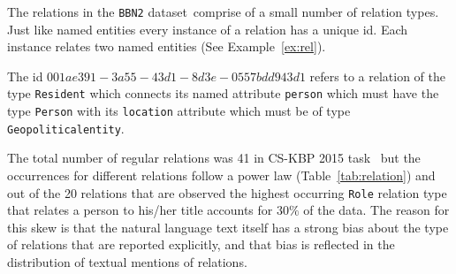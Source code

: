 \documentclass[paper=a4,fontsize=11pt]{scrartcl}
\newcommand{\Tabref}[1]{Table~\ref{#1}}
\newcommand{\Exref}[1]{Example~\ref{#1}}
\numberwithin{equation}{section}    %
\numberwithin{figure}{section}      %
\numberwithin{table}{section}       %
\newcommand{\dataset}[0]{\texttt{BBN2} dataset\ }
\newcommand{\task}{CS-KBP 2015 task\ }
\begin{document}
The relations in the \dataset comprise of a small number of relation types.
Just like named entities every instance of a relation has a unique id.
Each instance relates two named entities (See \Exref{ex:rel}).
\begin{example}\label{ex:rel}
  The id $001ae391-3a55-43d1-8d3e-0557bdd943d1$ refers to a relation of the
type \texttt{Resident} which connects its named attribute \texttt{person}
which must have the type \texttt{Person}
with its \texttt{location} attribute which must be of type
\texttt{Geopoliticalentity}.
\end{example}
The total number of regular relations was 41 in \task
but the occurrences for different relations follow a power law
(\Tabref{tab:relation}) and  out of the 20 relations that are observed the
highest occurring \texttt{Role} relation type
that relates a person to his/her title accounts for $30\%$ of the data.
The reason for this skew is that the
natural language text itself has a strong bias about the type of relations that are
reported explicitly, and that bias is reflected in the distribution of textual mentions
of relations.
\end{document}
